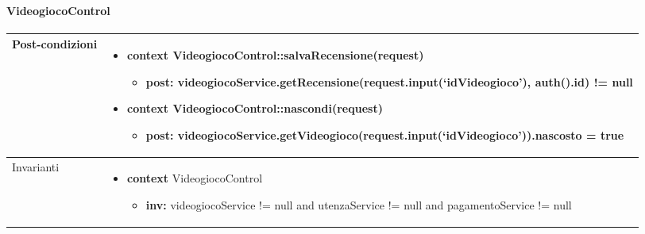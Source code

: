 \paragraph{VideogiocoControl}
\small\begin{tabular}{|| l | p{28em} ||} 
\hline
Post-condizioni & \begin{itemize}[leftmargin=*]
	\item \textbf{context} VideogiocoControl::salvaRecensione(request)
	\begin{itemize}
		\item[ ] \textbf{post:} videogiocoService.getRecensione(request.input(‘idVideogioco’), auth().id) != null
	\end{itemize}

	\item \textbf{context} VideogiocoControl::nascondi(request)
	\begin{itemize}
		\item[ ] \textbf{post:} videogiocoService.getVideogioco(request.input(‘idVideogioco’)).nascosto = true
	\end{itemize}
\end{itemize}\\
\hline
Invarianti & \begin{itemize}
	\item \textbf{context} VideogiocoControl
	\begin{itemize}
		\item[ ] \textbf{inv:} videogiocoService != null and utenzaService != null and pagamentoService != null
	\end{itemize}
\end{itemize}\\
\hline
\end{tabular}

\newpage

